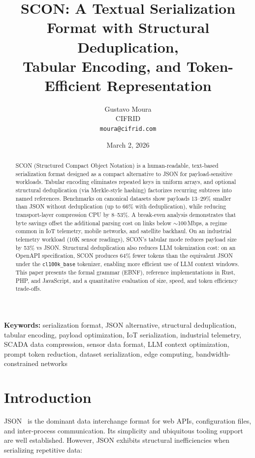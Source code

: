 \documentclass[11pt, a4paper]{article}
\title{\textbf{SCON: A Textual Serialization Format with Structural Deduplication,}\\
\textbf{Tabular Encoding, and Token-Efficient Representation}}
\author{Gustavo Moura \\
\small CIFRID \\
\small \texttt{moura@cifrid.com}}
\date{March 2, 2026}
\begin{document}
\maketitle

\begin{abstract}
SCON (Structured Compact Object Notation) is a human-readable,
text-based serialization format designed as a compact alternative
to JSON for payload-sensitive workloads.
Tabular encoding eliminates repeated keys in uniform arrays,
and optional structural deduplication (via Merkle-style hashing)
factorizes recurring subtrees into named references.
Benchmarks on canonical datasets show payloads 13--29\% smaller than
JSON without deduplication (up to 66\% with deduplication), while
reducing transport-layer compression CPU by 8--53\%.
A break-even analysis demonstrates that byte savings offset the
additional parsing cost on links below $\sim$100\,Mbps, a regime
common in IoT telemetry, mobile networks, and satellite backhaul.
On an industrial telemetry workload (10K sensor readings), SCON's
tabular mode reduces payload size by 53\% vs JSON.
Structural deduplication also reduces LLM tokenization cost:
on an OpenAPI specification, SCON produces 64\% fewer tokens than
the equivalent JSON under the \texttt{cl100k\_base} tokenizer,
enabling more efficient use of LLM context windows.
This paper presents the formal grammar (EBNF), reference
implementations in Rust, PHP, and JavaScript, and a quantitative
evaluation of size, speed, and token efficiency trade-offs.
\end{abstract}

\medskip
\noindent\textbf{Keywords:}
serialization format,
JSON alternative,
structural deduplication,
tabular encoding,
payload optimization,
IoT serialization,
industrial telemetry,
SCADA data compression,
sensor data format,
LLM context optimization,
prompt token reduction,
dataset serialization,
edge computing,
bandwidth-constrained networks

\tableofcontents
\newpage

\section{Introduction}
\label{sec:intro}

JSON~\cite{rfc8259} is the dominant data interchange format for web APIs,
configuration files, and inter-process communication. Its simplicity and
ubiquitous tooling support are well established. However, JSON exhibits
structural inefficiencies when serializing repetitive data:
\end{document}
